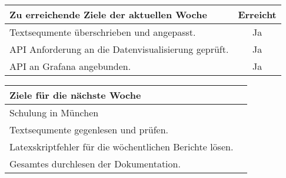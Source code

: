 \begin{tabularx}{\textwidth}{Xc}
    \arrayrulecolor{OliveGreen}
    \toprule
    {\bfseries Zu erreichende Ziele der aktuellen Woche} & {\bfseries Erreicht} \\
    \midrule[2pt]
    Textsequmente überschrieben und angepasst.               &Ja              \\
    \rowcolor{OliveGreen!15}
    API Anforderung an die Datenvisualisierung geprüft.      &Ja              \\
    \rowcolor{White}
    API an Grafana angebunden.                               &Ja              \\
    \bottomrule[2pt]
\end{tabularx}
%
\vspace{1cm}
%
\begin{tabularx}{\textwidth}{Xc}
    \arrayrulecolor{OliveGreen}
    \toprule
    {\bfseries Ziele für die nächste Woche}        &                         \\
    \midrule[2pt]
    Schulung in München                            &                         \\
    \rowcolor{OliveGreen!15}
    Textsequmente gegenlesen und prüfen.      &                         \\
    \rowcolor{White}
    Latexskriptfehler für die wöchentlichen Berichte lösen.  &               \\
    \rowcolor{OliveGreen!15}
    Gesamtes durchlesen der Dokumentation.                   &                \\
\end{tabularx}
